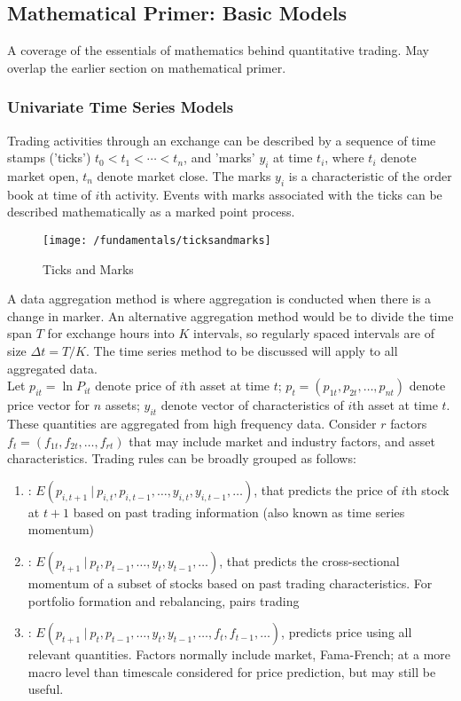 \subsection{Mathematical Primer: Basic Models}

A coverage of the essentials of mathematics behind quantitative trading. May overlap the earlier section on mathematical primer.

\subsubsection{Univariate Time Series Models}

Trading activities through an exchange can be described by a sequence of time stamps ('ticks') $t_0 < t_1 < \cdots < t_n$, and 'marks' $y_i$ at time $t_i$, where $t_i$ denote market open, $t_n$ denote market close. The marks $y_i$ is a characteristic of the order book at time of $i$th activity. Events with marks associated with the ticks can be described mathematically as a marked point process.
\begin{figure}[H]
\centering
\texttt{[image: /fundamentals/ticksandmarks]}
\caption{Ticks and Marks}
\end{figure}

A data aggregation method is where aggregation is conducted when there is a change in marker. An alternative aggregation method would be to divide the time span $T$ for exchange hours into $K$ intervals, so regularly spaced intervals are of size $\Delta t = T/K$. The time series method to be discussed will apply to all aggregated data.\\

Let $p_{it} = \ln P_{it}$ denote price of $i$th asset at time $t$; $p_t = (p_{1t}, p_{2t}, \ldots, p_{nt})$ denote price vector for $n$ assets; $y_{it}$ denote vector of characteristics of $i$th asset at time $t$. These quantities are aggregated from high frequency data. Consider $r$ factors $f_t = (f_{1t}, f_{2t}, \ldots, f_{rt})$ that may include market and industry factors, and asset characteristics. Trading rules can be broadly grouped as follows:
\begin{enumerate}[label=\roman*.]
\setlength{\itemsep}{0pt}
\item {}: $E(p_{i, t+1} \ \vert \ p_{i,t}, p_{i, t-1}, \ldots, y_{i,t}, y_{i, t-1}, \ldots)$, that predicts the price of $i$th stock at $t+1$ based on past trading information (also known as time series momentum)
\item {}: $E(p_{t+1} \ \vert \ p_t, p_{t-1}, \ldots, y_t, y_{t-1}, \ldots)$, that predicts the cross-sectional momentum of a subset of stocks based on past trading characteristics. For portfolio formation and rebalancing, pairs trading
\item {}: $E(p_{t+1} \ \vert \ p_{t}, p_{t-1}, \ldots, y_t, y_{t-1}, \ldots, f_t, f_{t-1}, \ldots)$, predicts price using all relevant quantities. Factors normally include market, Fama-French; at a more macro level than timescale considered for price prediction, but may still be useful.
\end{enumerate}

